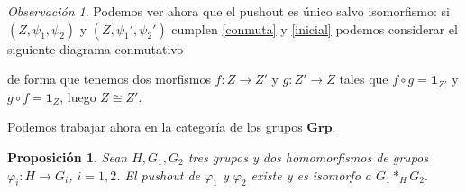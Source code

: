 \documentclass[12pt,a4paper]{book}
\newtheorem{prop}[thm]{Proposición}
\theoremstyle{definition} \newtheorem{defn}[thm]{Definición}
\theoremstyle{definition} \newtheorem{ejemplo}[thm]{Ejemplo}
\theoremstyle{definition} \newtheorem{ejercicio}[thm]{Ejercicio}
\theoremstyle{remark} \newtheorem*{obs}{Observación}
\begin{document}
\begin{obs}
Podemos ver ahora que el pushout es único salvo isomorfismo: si $(Z, \psi_1, \psi_2)$ y $(Z,\psi_1',\psi_2')$ cumplen \ref{conmuta} y \ref{inicial} podemos considerar el siguiente diagrama conmutativo
    \begin{center}
  \end{center}
de forma que tenemos dos morfismos $f:Z\rightarrow Z'$ y $g:Z'\rightarrow Z$ tales que $f\circ g= \mathbf{1}_{Z'}$ y $g\circ f=\mathbf{1}_{Z}$, luego $Z\cong Z'$.
\end{obs}

Podemos trabajar ahora en la categoría de los grupos $\mathbf{Grp}$. 
\begin{prop}
Sean $H, G_1, G_2$ tres grupos y dos homomorfismos de grupos $\varphi_i:H \rightarrow G_i$, $i=1,2$. El pushout de $\varphi_1$ y $\varphi_2$ existe y es isomorfo a 
$
  G_1*_H G_2.
  $
\end{prop}
\end{document}
